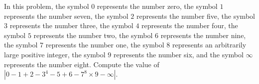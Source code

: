 In this problem, the symbol $0$ represents the number zero, the symbol $1$ represents the number seven, the symbol $2$ represents the number five, the symbol $3$ represents the number three, the symbol $4$ represents the number four, the symbol $5$ represents the number two, the symbol $6$ represents the number nine, the symbol $7$ represents the number one, the symbol $8$ represents an arbitrarily large positive integer, the symbol $9$ represents the number six, and the symbol $\infty$ represents the number eight. Compute the value of $\left|0-1+2-3^4-5+6-7^8\times9-\infty\right|$.